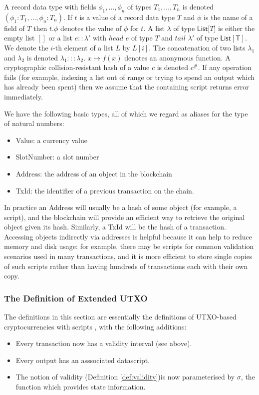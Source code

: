 \documentclass[a4paper]{article}
\theoremstyle{definition}  %
\begin{document}
A record data type with fields $\phi_1, \ldots, \phi_n$ of types $T_1,
\ldots, T_n$ is denoted $(\phi_1 : T_1, \ldots, \phi_n : T_n)$. If $t$
is a value of a record data type $T$ and $\phi$ is the name of a field
of $T$ then $t.\phi$ denotes the value of $\phi$ for $t$. A list
$\lambda$ of type $\mathsf{List[}T\mathsf{]}$ is either the empty list
$[]$ or a list $e :: \lambda'$ with $head$ $e$ of type $T$ and $tail$
$\lambda'$ of type $\mathsf{List[T]}$. We denote the $i$-th element of
a list $L$ by $L[i]$.  The concatenation of two lists $\lambda_1$ and
$\lambda_2$ is denoted $\lambda_1 ::: \lambda_2$. $x \mapsto f(x)$
denotes an anonymous function.  A cryptographic collision-resistant
hash of a value $c$ is denoted $c^{\#}$.  If any operation fails (for
example, indexing a list out of range or trying to spend an output
which has already been spent) then we assume that the containing script
returns \textsf{error} immediately.



We have the following basic types, all of which we regard as aliases for
the type of natural numbers:
\begin{itemize}
\item \textsf{Value}: a currency value
\item \textsf{SlotNumber}: a slot number
  \item \textsf{Address}: the address of an object in the blockchain
\item \textsf{TxId}: the identifier of a previous transaction on the chain.
\end{itemize}

\noindent In practice an \textsf{Address} will usually be a hash of
some object (for example, a script), and the blockchain will provide
an efficient way to retrieve the original object given its hash.
Similarly, a \textsf{TxId} will be the hash of a transaction.
Accessing objects indirectly via addresses is helpful because it can
help to reduce memory and disk usage: for example, there may be
scripts for common validation scenarios used in many transactions, and
it is more efficient to store single copies of such scripts rather
than having hundreds of transactions each with their own copy.

\subsubsection{The Definition of Extended UTXO}

The definitions in this section are essentially the definitions of
UTXO-based cryptocurrencies with scripts \cite{Zahnentferner18-UTxO},
with the following additions:
\begin{itemize}
\item Every transaction now has a validity interval (see above).
\item Every output has an asssociated datascript.
\item The notion of validity (Definition
  \ref{def:validity})is now parameterised by $\sigma$, the
  function which provides state information.
\end{itemize}
\end{document}
